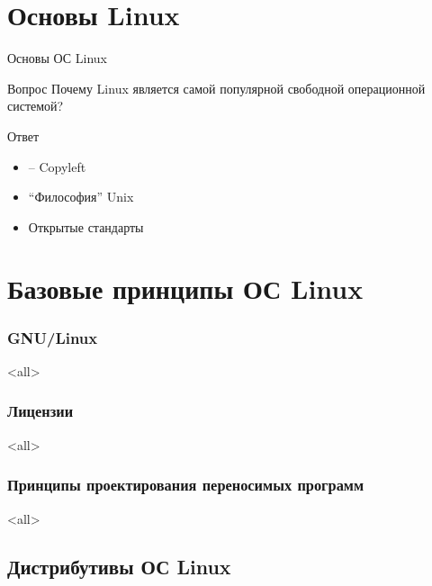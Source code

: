 \chapter{Основы Linux}

\begin{frame}{Основы ОС Linux}

	\begin{block}{Вопрос}
	Почему Linux является самой популярной
	свободной операционной системой?
	\end{block}

	\pause

	\begin{block}{Ответ}
	\begin{itemize}
		\item \textcopyleft -- Copyleft
		\item ``Философия'' Unix
		\item Открытые стандарты
	\end{itemize}
	\end{block}

\end{frame}


\chapter[Принципы]{Базовые принципы ОС Linux}

\subsection{GNU/Linux}

\mode<all>{}

\subsection{Лицензии}

\mode<all>{}

\subsection{Принципы проектирования переносимых программ}

\mode<all>{}

\section{Дистрибутивы ОС Linux}

